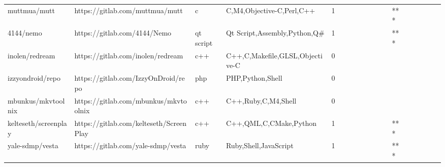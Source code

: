 \begin{tabular}{llllrlllllllllllll}
muttmua/mutt                                       &                    https://gitlab.com/muttmua/mutt &                 c &                          C,M4,Objective-C,Perl,C++ &       1 &         &        &           &                &                 &        &           &       *** &          &          &       &              &          \\
4144/nemo                                          &                       https://gitlab.com/4144/Nemo &         qt script &                       Qt Script,Assembly,Python,Q\# &       1 &         &        &           &                &                 &        &           &       *** &          &          &       &              &          \\
inolen/redream                                     &                  https://gitlab.com/inolen/redream &               c++ &                    C++,C,Makefile,GLSL,Objective-C &       0 &         &        &           &                &                 &        &           &           &          &          &       &              &          \\
izzyondroid/repo                                   &                https://gitlab.com/IzzyOnDroid/repo &               php &                                   PHP,Python,Shell &       0 &         &        &           &                &                 &        &           &           &          &          &       &              &          \\
mbunkus/mkvtoolnix                                 &              https://gitlab.com/mbunkus/mkvtoolnix &               c++ &                                C++,Ruby,C,M4,Shell &       0 &         &        &           &                &                 &        &           &           &          &          &       &              &          \\
kelteseth/screenplay                               &            https://gitlab.com/kelteseth/ScreenPlay &               c++ &                             C++,QML,C,CMake,Python &       1 &         &        &           &                &                 &        &           &       *** &          &          &       &              &          \\
yale-sdmp/vesta                                    &                 https://gitlab.com/yale-sdmp/vesta &              ruby &                              Ruby,Shell,JavaScript &       1 &         &        &           &                &                 &        &           &       *** &          &          &       &              &          \\

\end{tabular}
